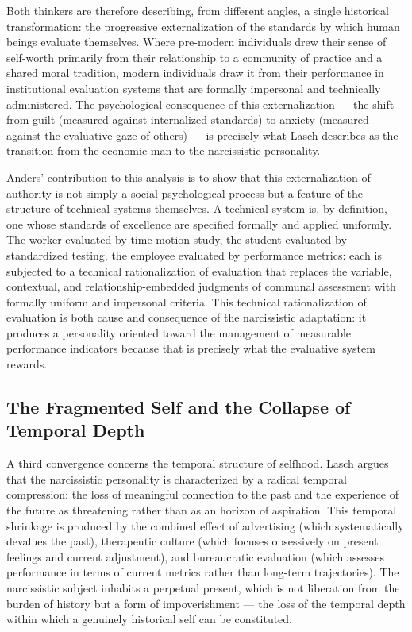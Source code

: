 \documentclass[12pt]{memoir}
\begin{document}
Both thinkers are therefore describing, from different angles, a single historical transformation:
the progressive externalization of the standards by which human beings evaluate themselves.
Where pre-modern individuals drew their sense of self-worth primarily from their relationship to
a community of practice and a shared moral tradition, modern individuals draw it from their
performance in institutional evaluation systems that are formally impersonal and technically
administered. The psychological consequence of this externalization — the shift from guilt
(measured against internalized standards) to anxiety (measured against the evaluative gaze of
others) — is precisely what Lasch describes as the transition from the economic man to the
narcissistic personality.

Anders' contribution to this analysis is to show that this externalization of authority is not
simply a social-psychological process but a feature of the structure of technical systems
themselves. A technical system is, by definition, one whose standards of excellence are
specified formally and applied uniformly. The worker evaluated by time-motion study, the
student evaluated by standardized testing, the employee evaluated by performance metrics:
each is subjected to a technical rationalization of evaluation that replaces the variable,
contextual, and relationship-embedded judgments of communal assessment with formally uniform
and impersonal criteria. This technical rationalization of evaluation is both cause and
consequence of the narcissistic adaptation: it produces a personality oriented toward the
management of measurable performance indicators because that is precisely what the evaluative
system rewards.

\subsection{The Fragmented Self and the Collapse of Temporal Depth}

A third convergence concerns the temporal structure of selfhood. Lasch argues that the narcissistic
personality is characterized by a radical temporal compression: the loss of meaningful connection
to the past and the experience of the future as threatening rather than as an horizon of
aspiration. This temporal shrinkage is produced by the combined effect of advertising (which
systematically devalues the past), therapeutic culture (which focuses obsessively on present
feelings and current adjustment), and bureaucratic evaluation (which assesses performance in
terms of current metrics rather than long-term trajectories). The narcissistic subject inhabits
a perpetual present, which is not liberation from the burden of history but a form of
impoverishment — the loss of the temporal depth within which a genuinely historical self can
be constituted.
\end{document}
